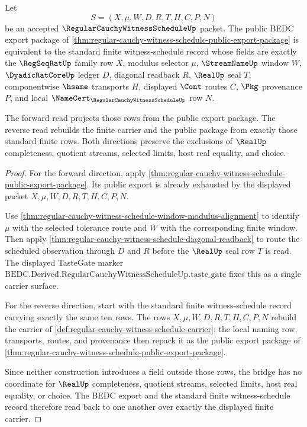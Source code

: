 \begin{theorem}
\label{thm:regular-cauchy-witness-schedule-standard-bridge}
Let
$$
S=(X,\mu,W,D,R,T,H,C,P,N)
$$
be an accepted $\RegularCauchyWitnessScheduleUp$ packet. The public BEDC export package of \autoref{thm:regular-cauchy-witness-schedule-public-export-package} is equivalent to the standard finite witness-schedule record whose fields are exactly the $\RegSeqRatUp$ family row $X$, modulus selector $\mu$, $\StreamNameUp$ window $W$, $\DyadicRatCoreUp$ ledger $D$, diagonal readback $R$, $\RealUp$ seal $T$, componentwise $\hsame$ transports $H$, displayed $\Cont$ routes $C$, $\Pkg$ provenance $P$, and local $\NameCert_{\RegularCauchyWitnessScheduleUp}$ row $N$.

The forward read projects those rows from the public export package. The reverse read rebuilds the finite carrier and the public package from exactly those standard finite rows. Both directions preserve the exclusions of $\RealUp$ completeness, quotient streams, selected limits, host real equality, and choice.
\end{theorem}
\begin{proof}
For the forward direction, apply \autoref{thm:regular-cauchy-witness-schedule-public-export-package}. Its public export is already exhausted by the displayed packet $X,\mu,W,D,R,T,H,C,P,N$.

Use \autoref{thm:regular-cauchy-witness-schedule-window-modulus-alignment} to identify $\mu$ with the selected tolerance route and $W$ with the corresponding finite window. Then apply \autoref{thm:regular-cauchy-witness-schedule-diagonal-readback} to route the scheduled observation through $D$ and $R$ before the $\RealUp$ seal row $T$ is read. The displayed TasteGate marker $\text{BEDC.Derived.RegularCauchyWitnessScheduleUp.taste\_gate}$ fixes this as a single carrier surface.

For the reverse direction, start with the standard finite witness-schedule record carrying exactly the same ten rows. The rows $X,\mu,W,D,R,T,H,C,P,N$ rebuild the carrier of \autoref{def:regular-cauchy-witness-schedule-carrier}; the local naming row, transports, routes, and provenance then repack it as the public export package of \autoref{thm:regular-cauchy-witness-schedule-public-export-package}.

Since neither construction introduces a field outside those rows, the bridge has no coordinate for $\RealUp$ completeness, quotient streams, selected limits, host real equality, or choice. The BEDC export and the standard finite witness-schedule record therefore read back to one another over exactly the displayed finite carrier.
\end{proof}


